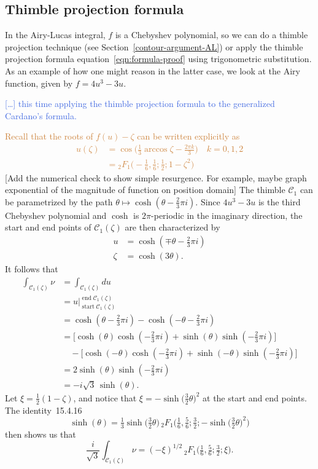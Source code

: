 \documentclass{article}
\theoremstyle{definition}
\theoremstyle{plain}
\newenvironment{todo}{\color{Coral}}{\color{black}}
\newenvironment{old}{\color{RoyalBlue}}{\color{black}}
\begin{document}
\begin{old}
\subsection{Thimble projection formula}
%
In the Airy-Lucas integral, $f$ is a Chebyshev polynomial, so we can do a thimble projection technique (see Section~\ref{contour-argument-AL}) or apply the thimble projection formula equation~\eqref{eqn:formula-proof} using trigonometric substitution. As an example of how one might reason in the latter case, we look at the Airy function, given by $f = 4u^3-3u$.

\textcolor{RoyalBlue}{[\ldots] this time applying the thimble projection formula to the generalized Cardano's formula.}

\textcolor{Peru}{Recall that the roots of $f(u)-\zeta$ can be written explicitly as 
\begin{align*}
    u(\zeta)&=\cos\Big(\frac{1}{3}\arccos\zeta-\frac{2\pi k}{3}\Big) \quad k=0,1,2\\
    &={}_2F_1\Big(-\frac{1}{6},\frac{1}{6};\frac{1}{2};1-\zeta^2\Big)
\end{align*}}
\begin{todo}[Add the numerical check to show simple resurgence. For example, maybe graph exponential of the magnitude of function on position domain]\end{todo}
The thimble $\mathcal{C}_1$ can be parametrized by the path $\theta \mapsto \cosh(\theta - \tfrac{2}{3}\pi i)$. Since $4u^3 - 3u$ is the third Chebyshev polynomial and $\cosh$ is $2\pi$-periodic in the imaginary direction, the start and end points of $\mathcal{C}_1(\zeta)$ are then characterized by
\begin{align*}
u & = \cosh(\mp\theta - \tfrac{2}{3}\pi i) \\
\zeta & = \cosh(3\theta).
\end{align*}
It follows that
\begin{align*}
\int_{\mathcal{C}_1(\zeta)} \nu & = \int_{\mathcal{C}_1(\zeta)} du \\
& = u \Big|_{\operatorname{start} \mathcal{C}_1(\zeta)}^{\operatorname{end} \mathcal{C}_1(\zeta)}\\
 & = \cosh(\theta - \tfrac{2}{3}\pi i) - \cosh(-\theta - \tfrac{2}{3}\pi i) \\
& = \big[\cosh(\theta) \cosh(-\tfrac{2}{3}\pi i) + \sinh(\theta) \sinh(-\tfrac{2}{3}\pi i)\big] \\
& \quad - \big[\cosh(-\theta) \cosh(-\tfrac{2}{3}\pi i) + \sinh(-\theta) \sinh(-\tfrac{2}{3}\pi i)\big] \\
& = 2\sinh(\theta) \sinh(-\tfrac{2}{3}\pi i) \\
& = -i\sqrt{3}\,\sinh(\theta).
\end{align*}
Let $\xi = \tfrac{1}{2}(1 - \zeta)$, and notice that $\xi = -\sinh\big(\tfrac{3}{2} \theta\big)^2$ at the start and end points. The identity~15.4.16 \cite{dlmf}
\[ \sinh( \theta) = \tfrac{1}{3} \sinh\big( \tfrac{3}{2}\theta\big)\,{}_2F_1\big(\tfrac{1}{6}, \tfrac{5}{6}; \tfrac{3}{2}; -\sinh\big(\tfrac{3}{2}\theta\big)^2\big) \]
then shows us that
\[ \frac{i}{\sqrt{3}} \int_{\mathcal{C}_1(\zeta)} \nu = (-\xi)^{1/2}\,{}_2F_1\big(\tfrac{1}{6}, \tfrac{5}{6}; \tfrac{3}{2}; \xi\big). \]


\end{old}
\end{document}
